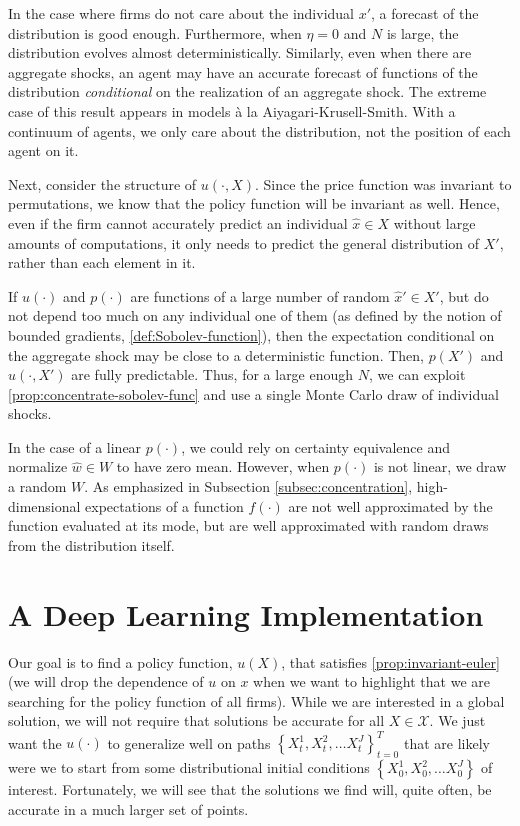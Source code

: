 \documentclass[12pt]{article}
\newcommand{\set}[1]{\ensuremath{\left\{{#1}\right\}}}
\begin{document}
In the case where firms do not care about the individual $x'$, a forecast of the distribution is good enough. Furthermore, when $\eta = 0$ and $N$ is large, the distribution evolves almost deterministically. Similarly, even when there are aggregate shocks, an agent may have an accurate forecast of functions of the distribution \textit{conditional} on the realization of an aggregate shock. The extreme case of this result appears in models \`a la Aiyagari-Krusell-Smith. With a continuum of agents, we only care about the distribution, not the position of each agent on it.

Next, consider the structure of $u(\cdot,X)$. Since the price function was invariant to permutations, we know that the policy function will be invariant as well. Hence, even if the firm cannot accurately predict an individual $\hat{x} \in X$ without large amounts of computations, it only needs to predict the general distribution of $X'$, rather than each element in it. 

If $u(\cdot)$ and $p(\cdot)$ are functions of a large number of random $\hat{x}' \in X'$, but do not depend too much on any individual one of them (as defined by the notion of bounded gradients, \cref{def:Sobolev-function}), then the expectation conditional on the aggregate shock may be close to a deterministic function. Then, $p(X')$ and $u(\cdot,X')$ are fully predictable. Thus, for a large enough $N$, we can exploit \cref{prop:concentrate-sobolev-func} and use a single Monte Carlo draw of individual shocks. 

In the case of a linear $p(\cdot)$, we could rely on certainty equivalence and normalize $\hat{w} \in W$ to have zero mean. However, when $p(\cdot)$ is not linear, we draw a random $W$. As emphasized in Subsection \ref{subsec:concentration}, high-dimensional expectations of a function $f(\cdot)$ are not well approximated by the function evaluated at its mode, but are well approximated with random draws from the distribution itself.
   
\section{A Deep Learning Implementation}\label{sec:deep-learning-implementation}

Our goal is to find a policy function, $u(X)$, that satisfies \cref{prop:invariant-euler} (we will drop the dependence of $u$ on $x$ when we want to highlight that we are searching for the policy function of all firms). While we are interested in a global solution, we will not require that solutions be accurate for all $X \in \mathcal{X}$. We just want the $u(\cdot)$ to generalize well on paths $\set{X^1_t, X^2_t, \ldots X^J_t}_{t=0}^T$ that are likely were we to start from some distributional initial conditions $\set{X^1_0, X^2_0, \ldots X^J_0}$ of interest. Fortunately, we will see that the solutions we find will, quite often, be accurate in a much larger set of points.
\end{document}

